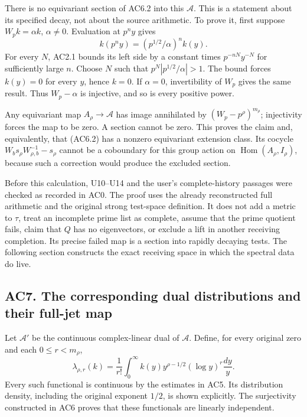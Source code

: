 There is no equivariant section of AC6.2 into this \(\mathcal A\). This
is a statement about its specified decay, not about the source
arithmetic. To prove it, first suppose \(W_pk=\alpha k\),
\(\alpha\ne0\). Evaluation at \(p^ny\) gives \[
 k(p^ny)=(p^{1/2}/\alpha)^n k(y).
\] For every \(N\), AC2.1 bounds its left side by a constant times
\(p^{-nN}y^{-N}\) for sufficiently large \(n\). Choose \(N\) such that
\(p^N|p^{1/2}/\alpha|>1\). The bound forces \(k(y)=0\) for every \(y\),
hence \(k=0\). If \(\alpha=0\), invertibility of \(W_p\) gives the same
result. Thus \(W_p-\alpha\) is injective, and so is every positive
power.

Any equivariant map \(A_\rho\to\mathcal A\) has image annihilated by
\((W_p-p^\rho)^{m_\rho}\); injectivity forces the map to be zero. A
section cannot be zero. This proves the claim and, equivalently, that
(AC6.2) has a nonzero equivariant extension class. Its cocycle
\(W_b s_\rho W_{\rho,b}^{-1}-s_\rho\) cannot be a coboundary for this
group action on \(\operatorname{Hom}(A_\rho,I_\rho)\), because such a
correction would produce the excluded section.

Before this calculation, U10--U14 and the user's complete-history
passages were checked as recorded in AC0. The proof uses the already
reconstructed full arithmetic and the original strong test-space
definition. It does not add a metric to \(\tau\), treat an incomplete
prime list as complete, assume that the prime quotient fails, claim that
\(Q\) has no eigenvectors, or exclude a lift in another receiving
completion. Its precise failed map is a section into rapidly decaying
tests. The following section constructs the exact receiving space in
which the spectral data do live.

\subsection{AC7. The corresponding dual distributions and their full-jet
map}\label{ac7.-the-corresponding-dual-distributions-and-their-full-jet-map}

Let \(\mathcal A'\) be the continuous complex-linear dual of
\(\mathcal A\). Define, for every original zero and each
\(0\leq r<m_\rho\), \[
 \lambda_{\rho,r}(k)
 =\frac1{r!}\int_0^\infty
 k(y)y^{\rho-1/2}(\log y)^r\frac{dy}{y}.
\tag{AC7.1}
\] Every such functional is continuous by the estimates in AC5. Its
distribution density, including the original exponent \(1/2\), is shown
explicitly. The surjectivity constructed in AC6 proves that these
functionals are linearly independent.


